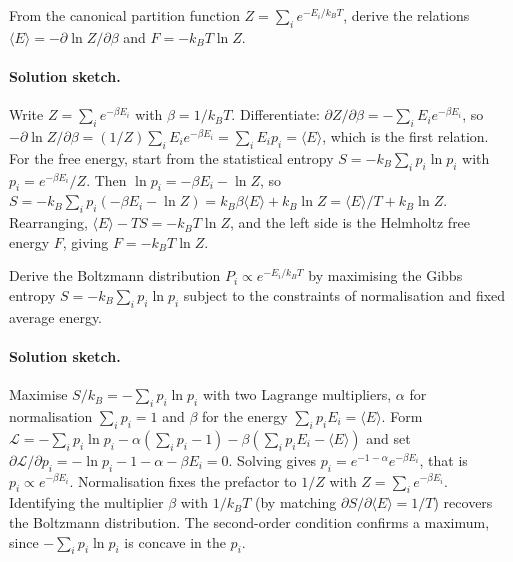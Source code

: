\begin{exercise}
From the canonical partition function $Z = \sum_i e^{-E_i/k_B T}$,
derive the relations $\langle E \rangle = -\partial \ln Z/\partial
\beta$ and $F = -k_B T \ln Z$.

\paragraph{Solution sketch.} Write $Z = \sum_i e^{-\beta E_i}$ with
$\beta = 1/k_B T$. Differentiate:
$\partial Z/\partial \beta = -\sum_i E_i e^{-\beta E_i}$, so
$-\partial \ln Z/\partial \beta = (1/Z)\sum_i E_i e^{-\beta E_i}
= \sum_i E_i p_i = \langle E \rangle$, which is the first relation.
For the free energy, start from the statistical entropy
$S = -k_B \sum_i p_i \ln p_i$ with $p_i = e^{-\beta E_i}/Z$. Then
$\ln p_i = -\beta E_i - \ln Z$, so
$S = -k_B \sum_i p_i(-\beta E_i - \ln Z)
= k_B \beta \langle E \rangle + k_B \ln Z
= \langle E \rangle/T + k_B \ln Z$. Rearranging,
$\langle E \rangle - TS = -k_B T \ln Z$, and the left side is the
Helmholtz free energy $F$, giving $F = -k_B T \ln Z$.
\end{exercise}

\begin{exercise}
Derive the Boltzmann distribution $P_i \propto e^{-E_i/k_B T}$ by
maximising the Gibbs entropy $S = -k_B \sum_i p_i \ln p_i$ subject to
the constraints of normalisation and fixed average energy.

\paragraph{Solution sketch.} Maximise $S/k_B = -\sum_i p_i \ln p_i$
with two Lagrange multipliers, $\alpha$ for normalisation
$\sum_i p_i = 1$ and $\beta$ for the energy $\sum_i p_i E_i =
\langle E \rangle$. Form
$\mathcal{L} = -\sum_i p_i \ln p_i - \alpha(\sum_i p_i - 1)
- \beta(\sum_i p_i E_i - \langle E \rangle)$ and set
$\partial \mathcal{L}/\partial p_i = -\ln p_i - 1 - \alpha
- \beta E_i = 0$. Solving gives
$p_i = e^{-1-\alpha} e^{-\beta E_i}$, that is
$p_i \propto e^{-\beta E_i}$. Normalisation fixes the prefactor to
$1/Z$ with $Z = \sum_i e^{-\beta E_i}$. Identifying the multiplier
$\beta$ with $1/k_B T$ (by matching $\partial S/\partial \langle E
\rangle = 1/T$) recovers the Boltzmann distribution. The second-order
condition confirms a maximum, since $-\sum_i p_i \ln p_i$ is concave in
the $p_i$.
\end{exercise}

